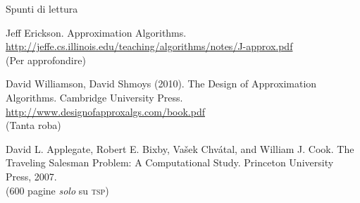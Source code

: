 \begin{frame}{Spunti di lettura}

\vspace{-9pt}
\begin{myboxtitle}[Bibliografia]
\BIL
\item Jeff Erickson. Approximation Algorithms. \\ \url{http://jeffe.cs.illinois.edu/teaching/algorithms/notes/J-approx.pdf}\\
(Per approfondire)
\item David Williamson, David Shmoys (2010). The Design of Approximation Algorithms. Cambridge University Press.\\
\url{http://www.designofapproxalgs.com/book.pdf}\\
(Tanta roba)
\item David L. Applegate, Robert E. Bixby, Vašek Chvátal, and William J. Cook. The Traveling Salesman Problem: A Computational Study. Princeton University Press, 2007.\\
(600 pagine \emph{solo} su \textsc{tsp})
\EIL
\end{myboxtitle}


\end{frame}

